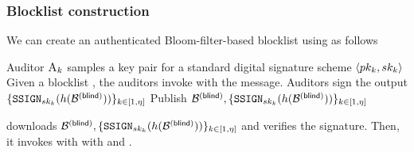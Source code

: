\subsubsection{Blocklist construction}
%
We can create an authenticated Bloom-filter-based blocklist using \authOPRFFunc as follows 

\begin{algorithm}
\caption{Bloom Filter Based Blocklist}
\label{acb:bf}
\footnotesize
\begin{algorithmic}[1]


\Procedure{\publishList}{\blocklist}


\State Auditor $\auditor[\auditorIdx]$ samples a key pair for a standard digital signature scheme $\langle \auditorPubKeyGenericScheme[\auditorIdx], \auditorPrivKeyGenericScheme[\auditorIdx] \rangle$
\State Given a blocklist \blocklist, the auditors invoke \authOPRFFunc with the \publishList message. Auditors sign the output \blindedBlocklist $\{ \signGenSig[\auditorPrivKeyGenericScheme[\auditorIdx]](\hashFn(\blindedBlocklist)) \}_{\auditorIdx \in [1, \numAuditors]}$
\State Publish $\blindedBlocklist, \{ \signGenSig[\auditorPrivKeyGenericScheme[\auditorIdx]](\hashFn(\blindedBlocklist)) \}_{\auditorIdx \in [1, \numAuditors]}$
\EndProcedure


\Statex\Procedure{\preprocess}{\blindedBlocklist}



\State \client downloads $\blindedBlocklist, \{ \signGenSig[\auditorPrivKeyGenericScheme[\auditorIdx]](\hashFn(\blindedBlocklist)) \}_{\auditorIdx \in [1, \numAuditors]}$ and verifies the signature. Then, it invokes \authOPRFFunc with \evaluate with \blindedBlocklist and \prfKeyClient. 



\end{algorithmic}
\end{algorithm}
